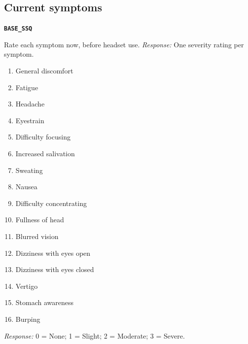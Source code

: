 \documentclass[11pt,letterpaper]{article}
\newcommand{\qid}[1]{\par\smallskip\textbf{\texttt{#1}}\par}
\begin{document}
\subsection{Current symptoms}
\qid{BASE\_SSQ}
Rate each symptom now, before headset use.
\textit{Response:} One severity rating per symptom.
\begin{enumerate}
\item General discomfort
\item Fatigue
\item Headache
\item Eyestrain
\item Difficulty focusing
\item Increased salivation
\item Sweating
\item Nausea
\item Difficulty concentrating
\item Fullness of head
\item Blurred vision
\item Dizziness with eyes open
\item Dizziness with eyes closed
\item Vertigo
\item Stomach awareness
\item Burping
\end{enumerate}
\textit{Response:} 0 = None; 1 = Slight; 2 = Moderate; 3 = Severe.
\end{document}

